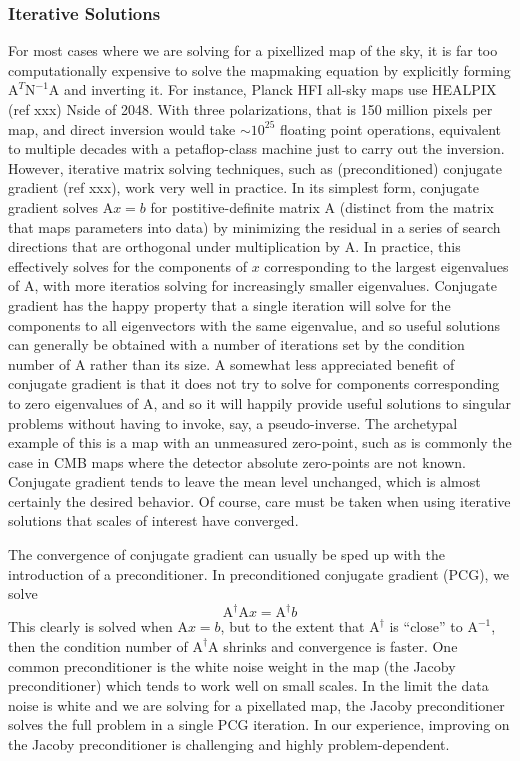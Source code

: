 \documentclass[12]{article}
\begin{document}
\subsubsection{Iterative Solutions}
For most cases where we are solving for a pixellized map of the sky,
it is far too computationally expensive to solve the mapmaking
equation by explicitly forming $\mathrm{A}^T \mathrm{N}^{-1}
\mathrm{A}$ and inverting it.  For instance, Planck HFI all-sky maps
use HEALPIX (ref xxx) Nside of 2048.  With three polarizations, that
is 150 million pixels per map, and direct inversion would take
$\sim10^{25}$ floating point operations, equivalent to multiple
decades with a petaflop-class machine just to carry out the
inversion.  However, iterative matrix solving techniques, such as
(preconditioned) conjugate gradient (ref xxx), work very well in
practice.  In its simplest form, conjugate gradient solves
$\mathrm{A}x=b$ for postitive-definite matrix $\mathrm{A}$ (distinct
from the matrix that maps parameters into data) by minimizing the
residual in a series of search directions that are orthogonal under
multiplication by $\mathrm{A}$.  In practice, this effectively solves
for the components of $x$ corresponding to the largest eigenvalues of
$\mathrm{A}$, with more iteratios solving for increasingly smaller
eigenvalues.  Conjugate gradient has the happy property that a single
iteration will solve for the components to all eigenvectors with the
same eigenvalue, and so useful solutions can generally be obtained
with a number of iterations set by the condition number of
$\mathrm{A}$ rather than its size.  A somewhat less appreciated
benefit of conjugate gradient is that it does not try to solve for
components corresponding to zero eigenvalues of $\mathrm{A}$, and so
it will happily provide useful solutions to singular problems without
having to invoke, say, a pseudo-inverse.  The archetypal example of
this is a map with an unmeasured zero-point, such as is commonly the
case in CMB maps where the detector absolute zero-points are not
known.  Conjugate gradient tends to leave the mean level unchanged,
which is almost certainly the desired behavior.  Of course, care must
be taken when using iterative solutions that scales of interest have
converged.  

The convergence of conjugate gradient can usually be sped up with the
introduction of a preconditioner.  In preconditioned conjugate
gradient (PCG), we solve 
\begin{equation}
\mathrm{A}^{\dagger}\mathrm{A}x=\mathrm{A}^{\dagger}b
\end{equation}
This clearly is solved when $\mathrm{A}x=b$, but to the extent that
$\mathrm{A}^\dagger$ is ``close'' to $\mathrm{A}^{-1}$, then the
condition number of $\mathrm{A}^{\dagger}\mathrm{A}$ shrinks and
convergence is faster.  One common preconditioner is the white noise
weight in the map (the Jacoby preconditioner) which tends to work well
on small scales.  In the limit the data noise is white and we are
solving for a pixellated map, the Jacoby preconditioner solves the
full problem in a single PCG iteration.  In our experience, improving
on the Jacoby preconditioner is challenging and highly
problem-dependent.  
\end{document}
